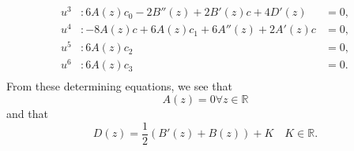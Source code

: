 \begin{align*}
u^{3}&:6 A(z) c_{0} - 2 B''(z) + 2 B'(z) c + 4 D'(z)&=0,\\
u^{4}&:- 8 A(z) c + 6 A(z) c_{1} + 6 A''(z) + 2 A'(z) c&=0,\\
u^{5}&:6 A(z) c_{2}&=0,\\
u^{6}&:6 A(z) c_{3}&=0.\\
\end{align*}
From these determining equations, we see that
$$A(z)=0\forall z\in\mathbb{R}$$
and that
$$D(z)=\dfrac{1}{2}\left(B'(z)+B(z)\right)+K\quad K\in\mathbb{R}.$$

